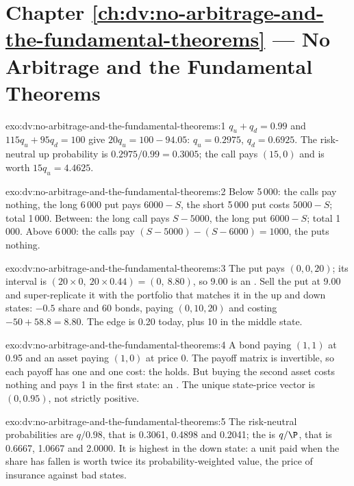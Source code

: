 \section*{Chapter \ref{ch:dv:no-arbitrage-and-the-fundamental-theorems} --- No Arbitrage and the Fundamental Theorems}

\begin{solution}{exo:dv:no-arbitrage-and-the-fundamental-theorems:1}
$q_u+q_d=0.99$ and $115q_u+95q_d=100$ give $20q_u=100-94.05$: $q_u=0.2975$,
$q_d=0.6925$. The risk-neutral up probability is $0.2975/0.99=0.3005$; the call
pays $(15,0)$ and is worth $15q_u=4.4625$.
\end{solution}

\begin{solution}{exo:dv:no-arbitrage-and-the-fundamental-theorems:2}
Below 5\,000: the calls pay nothing, the long 6\,000 put pays $6000-S$, the short
5\,000 put costs $5000-S$; total 1\,000. Between: the long call pays $S-5000$, the
long put $6000-S$; total 1\,000. Above 6\,000: the calls pay $(S-5000)-(S-6000)=1000$,
the puts nothing.
\end{solution}

\begin{solution}{exo:dv:no-arbitrage-and-the-fundamental-theorems:3}
The put pays $(0,0,20)$; its interval is $(20\times0,\ 20\times0.44)=(0,\ 8.80)$,
so 9.00 is an . Sell the put at 9.00 and super-replicate it with the
portfolio that matches it in the up and down states: $-0.5$ share and 60 bonds,
paying $(0,10,20)$ and costing $-50+58.8=8.80$. The edge is 0.20 today, plus 10 in
the middle state.
\end{solution}

\begin{solution}{exo:dv:no-arbitrage-and-the-fundamental-theorems:4}
A bond paying $(1,1)$ at 0.95 and an asset paying $(1,0)$ at price 0. The payoff
matrix is invertible, so each payoff has one  and one cost:
the  holds. But buying the second asset costs nothing and pays 1
in the first state: an . The unique state-price vector is $(0,0.95)$, not
strictly positive.
\end{solution}

\begin{solution}{exo:dv:no-arbitrage-and-the-fundamental-theorems:5}
The risk-neutral probabilities are $q/0.98$, that is 0.3061, 0.4898 and 0.2041;
the  is $q/\P$, that is 0.6667, 1.0667 and 2.0000. It is highest in the down state: a unit paid when
the share has fallen is worth twice its probability-weighted value, the price of
insurance against bad states.
\end{solution}

